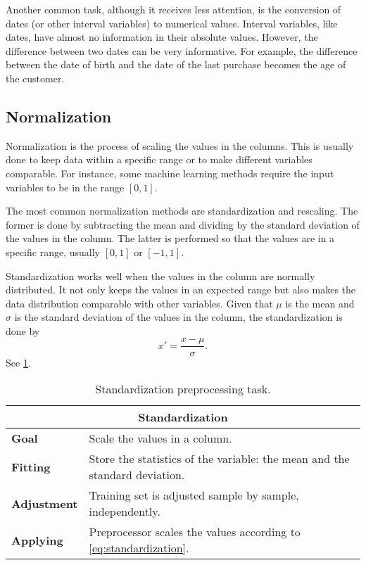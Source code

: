 Another common task, although it receives less attention, is the conversion of dates (or
other interval variables) to numerical values.  Interval variables, like dates, have
almost no information in their absolute values.  However, the difference between two
dates can be very informative.  For example, the difference between the date of birth and
the date of the last purchase becomes the age of the customer.

\subsection{Normalization}

Normalization is the process of scaling the values in the columns.  This is usually done to
keep data within a specific range or to make different variables comparable.  For instance,
some machine
learning methods require the input variables to be in the range $[0, 1]$.

The most common normalization methods are standardization and rescaling.  The former is done
by subtracting the mean and dividing by the standard deviation of the values in the column.
The latter is performed so that the values are in a specific range, usually $[0, 1]$ or $[-1, 1]$.

Standardization works well when the values in the column are normally distributed.
It not only keeps the values in an expected range but also makes the data distribution
comparable with other variables.  Given that $\mu$ is the mean and $\sigma$ is the
standard deviation of the values in the column, the standardization is done by
\begin{equation}
  \label{eq:standardization}
  x' = \frac{x - \mu}{\sigma}\text{.}
\end{equation}
See \cref{tab:standardization}.

\begin{table}\caption{Standardization preprocessing task.}
  \centering
  \begin{tabular}{lp{6cm}}
    \toprule
    \multicolumn{2}{c}{\textbf{Standardization}} \\
    \midrule
    \textbf{Goal} &
      Scale the values in a column. \\
    \textbf{Fitting} &
      Store the statistics of the variable: the mean and the standard deviation. \\
    \textbf{Adjustment} &
      Training set is adjusted sample by sample, independently. \\
    \textbf{Applying} &
      Preprocessor scales the values according to \cref{eq:standardization}. \\
    \bottomrule
  \end{tabular}
  \label{tab:standardization}
\end{table}

